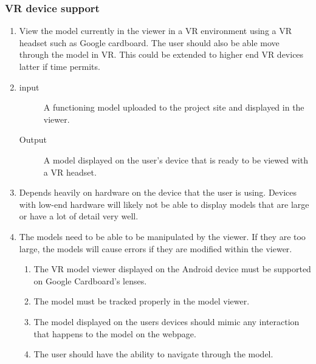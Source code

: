\documentclass[letterpaper, 10pt, draftclsnofoot, compsoc, onecolumn]{IEEEtran}
\begin{document}
\subsubsection{VR device support}

\begin{enumerate}
	\item View the model currently in the viewer in a VR environment using a VR headset such as Google cardboard. The user should also
	be able move through the model in VR. This could be extended to higher end VR devices latter if time permits.

	\item
	\begin{description}
		\item[input] A functioning model uploaded to the project site and displayed in the viewer.
		\item[Output] A model displayed on the user's device that is ready to be viewed with a VR headset.
	\end{description}

	\item Depends heavily on hardware on the device that the user is using. Devices with low-end hardware will likely not be able to 
	display models that are large or have a lot of detail very well.  

	\item The models need to be able to be manipulated by the viewer. If they are too large, the models will cause errors if they are 
	modified within the viewer.  

	\begin{enumerate}
		\item The VR model viewer displayed on the Android device must be supported on Google Cardboard's lenses. 
		\item The model must be tracked properly in the model viewer. 
		\item The model displayed on the users devices should mimic any interaction that happens to the model on the webpage.
		\item The user should have the ability to navigate through the model. 
	\end{enumerate} 
\end{enumerate}
\end{document}
